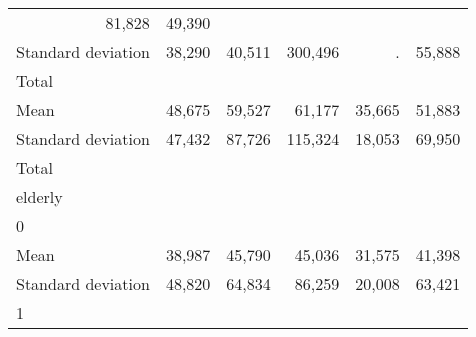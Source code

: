 \begin{tabular}{llllll}
  \multicolumn{1}{r}{81,828} &
  \multicolumn{1}{r}{49,390} \\
\multicolumn{1}{l}{\hspace{4em}Standard deviation} &
  \multicolumn{1}{|r}{38,290} &
  \multicolumn{1}{r}{40,511} &
  \multicolumn{1}{r}{300,496} &
  \multicolumn{1}{r}{.} &
  \multicolumn{1}{r}{55,888} \\
\multicolumn{1}{l}{\hspace{3em}Total} &
  \multicolumn{1}{|r}{} &
  \multicolumn{1}{r}{} &
  \multicolumn{1}{r}{} &
  \multicolumn{1}{r}{} &
  \multicolumn{1}{r}{} \\
\multicolumn{1}{l}{\hspace{4em}Mean} &
  \multicolumn{1}{|r}{48,675} &
  \multicolumn{1}{r}{59,527} &
  \multicolumn{1}{r}{61,177} &
  \multicolumn{1}{r}{35,665} &
  \multicolumn{1}{r}{51,883} \\
\multicolumn{1}{l}{\hspace{4em}Standard deviation} &
  \multicolumn{1}{|r}{47,432} &
  \multicolumn{1}{r}{87,726} &
  \multicolumn{1}{r}{115,324} &
  \multicolumn{1}{r}{18,053} &
  \multicolumn{1}{r}{69,950} \\
\multicolumn{1}{l}{\hspace{1em}Total} &
  \multicolumn{1}{|r}{} &
  \multicolumn{1}{r}{} &
  \multicolumn{1}{r}{} &
  \multicolumn{1}{r}{} &
  \multicolumn{1}{r}{} \\
\multicolumn{1}{l}{\hspace{2em}elderly} &
  \multicolumn{1}{|r}{} &
  \multicolumn{1}{r}{} &
  \multicolumn{1}{r}{} &
  \multicolumn{1}{r}{} &
  \multicolumn{1}{r}{} \\
\multicolumn{1}{l}{\hspace{3em}0} &
  \multicolumn{1}{|r}{} &
  \multicolumn{1}{r}{} &
  \multicolumn{1}{r}{} &
  \multicolumn{1}{r}{} &
  \multicolumn{1}{r}{} \\
\multicolumn{1}{l}{\hspace{4em}Mean} &
  \multicolumn{1}{|r}{38,987} &
  \multicolumn{1}{r}{45,790} &
  \multicolumn{1}{r}{45,036} &
  \multicolumn{1}{r}{31,575} &
  \multicolumn{1}{r}{41,398} \\
\multicolumn{1}{l}{\hspace{4em}Standard deviation} &
  \multicolumn{1}{|r}{48,820} &
  \multicolumn{1}{r}{64,834} &
  \multicolumn{1}{r}{86,259} &
  \multicolumn{1}{r}{20,008} &
  \multicolumn{1}{r}{63,421} \\
\multicolumn{1}{l}{\hspace{3em}1} &
  \multicolumn{1}{|r}{} &

\end{tabular}
